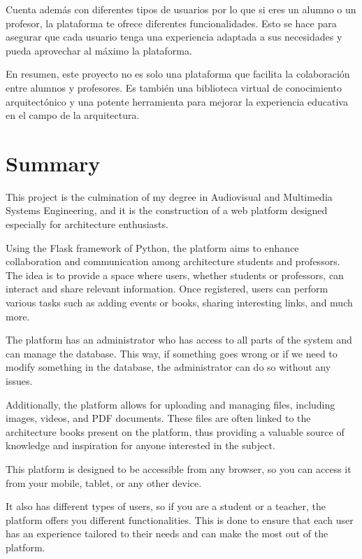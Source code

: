 \documentclass[a4paper, 12pt]{book}
\begin{document}
Cuenta además con diferentes tipos de usuarios por lo que si eres un alumno o un profesor, la plataforma te ofrece diferentes funcionalidades. 
Esto se hace para asegurar que cada usuario tenga una experiencia adaptada a sus necesidades y pueda aprovechar al máximo la plataforma.

En resumen, este proyecto no es solo una plataforma que facilita la colaboración entre alumnos y profesores. Es también 
una biblioteca virtual de conocimiento arquitectónico y una potente herramienta para mejorar la experiencia educativa en el campo de la 
arquitectura.


\chapter*{Summary}

This project is the culmination of my degree in Audiovisual and Multimedia Systems Engineering, and it is the construction of a web 
platform designed especially for architecture enthusiasts.

Using the Flask framework of Python, the platform aims to enhance collaboration and communication among architecture students and 
professors. The idea is to provide a space where users, whether students or professors, can interact and share relevant information. 
Once registered, users can perform various tasks such as adding events or books, sharing interesting links, and much more.

The platform has an administrator who has access to all parts of the system and can manage the database. This way, if something goes 
wrong or if we need to modify something in the database, the administrator can do so without any issues.

Additionally, the platform allows for uploading and managing files, including images, videos, and PDF documents. These files are often 
linked to the architecture books present on the platform, thus providing a valuable source of knowledge and inspiration for anyone 
interested in the subject.

This platform is designed to be accessible from any browser, so you can access it from your mobile, tablet, or any other device.

It also has different types of users, so if you are a student or a teacher, the platform offers you different functionalities. This 
is done to ensure that each user has an experience tailored to their needs and can make the most out of the platform.
\end{document}
